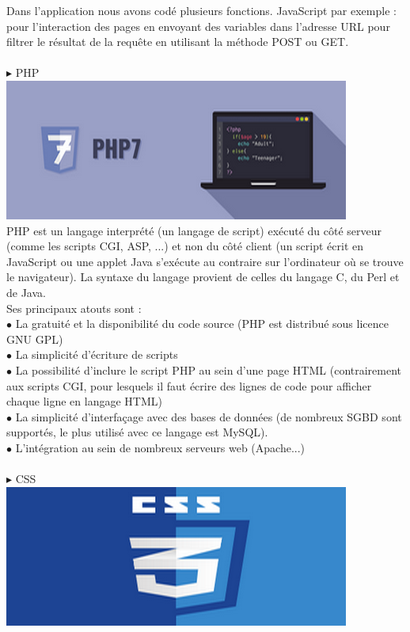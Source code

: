 \documentclass[a4paper, 12pt]{report}
\begin{document}
Dans l’application nous avons codé plusieurs fonctions. JavaScript par exemple : pour l’interaction des pages en envoyant des variables dans l’adresse URL pour filtrer le résultat de la requête en utilisant la méthode POST ou GET.
\\
\\
\noindent $\blacktriangleright$ PHP
\\
\includegraphics{img/outils/4}
\\
\noindent PHP est un langage interprété (un langage de script) exécuté du côté serveur (comme les scripts CGI, ASP, ...) et non du côté client (un script écrit en JavaScript ou une applet Java s'exécute au contraire sur l'ordinateur où se trouve le navigateur). La syntaxe du langage provient de celles du langage C, du Perl et de Java.
\\
\noindent Ses principaux atouts sont :
\\
\noindent $\bullet$ La gratuité et la disponibilité du code source (PHP est distribué sous licence GNU GPL)
\\
\noindent $\bullet$ La simplicité d'écriture de scripts
\\
\noindent $\bullet$ La possibilité d'inclure le script PHP au sein d'une page HTML (contrairement aux scripts CGI, pour lesquels il faut écrire des lignes de code pour afficher chaque ligne en langage HTML)
\\
\noindent $\bullet$ La simplicité d'interfaçage avec des bases de données (de nombreux SGBD sont supportés, le plus utilisé avec ce langage est MySQL).
\\
\noindent $\bullet$ L'intégration au sein de nombreux serveurs web (Apache...)
\\
\\
\noindent $\blacktriangleright$ CSS
\\
\includegraphics{img/outils/5}
\end{document}
